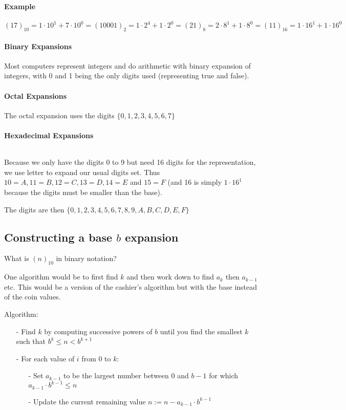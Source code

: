 \documentclass[10pt,a4paper]{book}
\begin{document}
\paragraph*{Example}
$(17)_{10} = 1\cdot 10^1 + 7\cdot 10^0 = (10001)_2 = 1\cdot 2^4 + 1\cdot 2^0 = (21)_8 = 2\cdot 8^1 + 1\cdot 8^0 = (11)_{16} = 1\cdot 16^1 + 1\cdot 16^0$
\paragraph*{Binary Expansions}
Most computers represent integers and do arithmetic with binary expansion of integers, with 0 and 1 being the only digits used (representing true and false).
\paragraph*{Octal Expansions}
The octal expansion uses the digits $\{0,1,2,3,4,5,6,7\}$
\paragraph*{Hexadecimal Expansions}
$\ $\par
Because we only have the digits 0 to 9 but need 16 digits for the representation, we use letter to expand our usual digits set. Thus $10=A, 11=B, 12=C, 13=D, 14=E$ and $15=F$ (and 16 is simply $1\cdot 16^1$ because the digits must be smaller than the base).\par 
The digits are then $\{0,1,2,3,4,5,6,7,8,9,A,B,C,D,E,F\}$
\subsection{Constructing a base $b$ expansion}
What is $(n)_10$ in binary notation?\par
One algorithm would be to first find $k$ and then work down to find $a_k$ then $a_{k-1}$ etc. This would be a version of the cashier's algorithm but with the base instead of the coin values.\par 
Algorithm:
\begin{itemize}
\item[-] Find $k$ by computing successive powers of $b$ until you find the smallest $k$ such that $b^k \leq n < b^{k+1}$
\item[-] For each value of $i$ from 0 to $k$:
	\begin{itemize}
	\item[-] Set $a_{k-1}$ to be the largest number between 0 and $b-1$ for which $a_{k-1}\cdot b^{k-1} \leq n$
	\item[-] Update the current remaining value $n := n-a_{k-1}\cdot b^{k-1}$
	\end{itemize}
\end{itemize}
\end{document}
